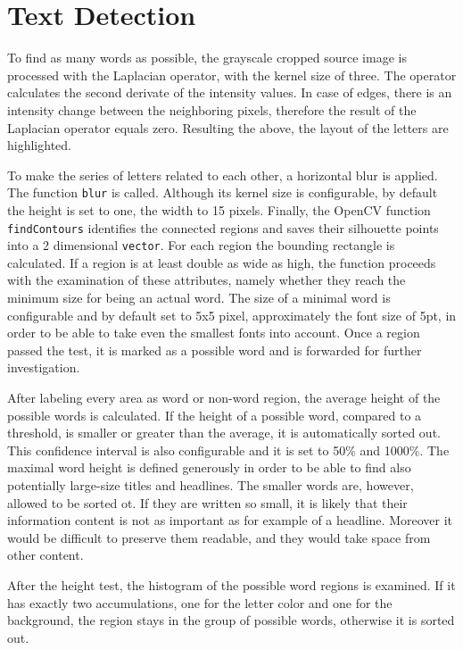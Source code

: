 \documentclass[draft,final]{vutinfth} %
\begin{document}
	\section{Text Detection}
	To find as many words as possible, the grayscale cropped source image is processed with the Laplacian operator, with the kernel size of three.
	The operator calculates the second derivate of the intensity values.
	In case of edges, there is an intensity change between the neighboring pixels, therefore the result of the Laplacian operator equals zero. 
	Resulting the above, the layout of the letters are highlighted.\par 
	To make the series of letters related to each other, a horizontal blur is applied.
	The function \texttt{blur} is called. 
	Although its kernel size is configurable, by default the height is set to one, the width to 15 pixels. 
	Finally, the OpenCV function  \texttt{findContours} identifies the connected regions and saves their silhouette points into a 2 dimensional \texttt{vector}.
	For each region the bounding rectangle is calculated.
	If a region is at least double as wide as high, the function proceeds with the examination of these attributes, namely whether they reach the minimum size for being an actual word.
	The size of a minimal word is configurable and by default set to 5x5 pixel, approximately the font size of 5pt, in order to be able to take even the smallest fonts into account.
	Once a region passed the test, it is marked as a possible word and is forwarded for further investigation.\par 
	After labeling every area as word or non-word region, the average height of the possible words is calculated.
	If the height of a possible word, compared to a threshold, is smaller or greater than the average, it is automatically sorted out.
	This confidence interval is also configurable and it is set to 50\% and 1000\%. 
	The maximal word height is defined generously in order to be able to find also  potentially large-size titles and headlines.
	The smaller words are, however, allowed to be sorted ot.
	If they are written so small, it is likely that their information content is not as important as for example of a headline.
	Moreover it would be difficult to preserve them readable, and they would take space from other content.\par 
	After the height test, the histogram of the possible word regions is examined.
	If it has exactly two accumulations, one for the letter color and one for the background, the region stays in the group of possible words, otherwise it is sorted out.\par
\end{document}
